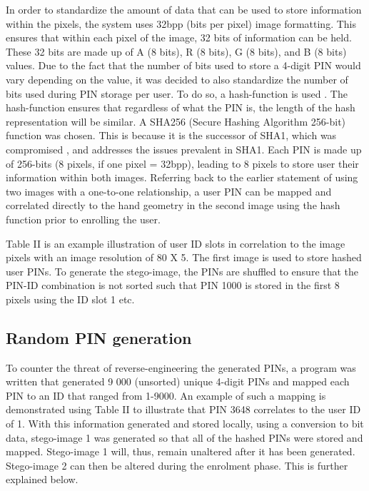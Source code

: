 
In order to standardize the amount of data that can be used to store information within the pixels, the system uses 32bpp (bits per pixel) image formatting. This ensures that within each pixel of the image, 32 bits of information can be held. These 32 bits are made up of A (8 bits), R (8 bits), G (8 bits), and B (8 bits) values. Due to the fact that the number of bits used to store a 4-digit PIN would vary depending on the value, it was decided to also standardize the number of bits used during PIN storage per user. To do so, a hash-function is used \citep{Kashyap2016}. 
The hash-function ensures that regardless of what the PIN is, the length of the hash representation will be similar. A SHA256 (Secure Hashing Algorithm 256-bit) function was chosen. This is because it is the successor of SHA1, which was compromised \citep{Brandom}, and addresses the issues prevalent in SHA1.
Each PIN is made up of 256-bits (8 pixels, if one pixel = 32bpp), leading to 8 pixels to store user their information within both images. Referring back to the earlier statement of using two images with a one-to-one relationship, a user PIN can be mapped and correlated directly to the hand geometry in the second image using the hash function prior to enrolling the user.

Table II is an example illustration of user ID slots in correlation to the image pixels with an image resolution of 80 X 5. The first image is used to store hashed user PINs. 
To generate the stego-image, the PINs are shuffled to ensure that the PIN-ID combination is not sorted such that PIN 1000 is stored in the first 8 pixels using the ID slot 1 etc.

\subsection{Random PIN generation}

To counter the threat of reverse-engineering the generated PINs, a program was written that generated 9 000 (unsorted) unique 4-digit PINs and mapped each PIN to an ID that ranged from 1-9000. An example of such a mapping is demonstrated using Table II to illustrate that PIN 3648 correlates to the user ID of 1. With this information generated and stored locally, using a conversion to bit data, stego-image 1 was generated so that all of the hashed PINs were stored and mapped. Stego-image 1 will, thus, remain unaltered after it has been generated. Stego-image 2 can then be altered during the enrolment phase. This is further explained below.

